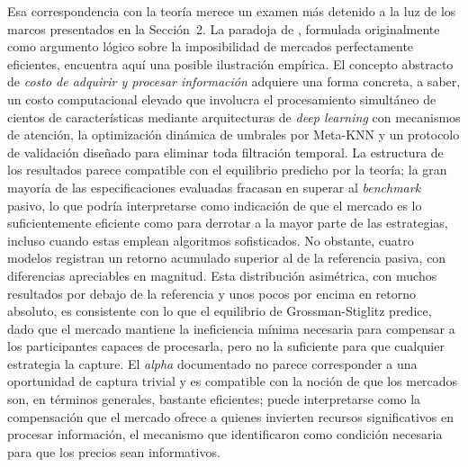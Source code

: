 ﻿\documentclass[11pt,a4paper]{article}
\begin{document}
Esa correspondencia con la teor\'ia merece un examen m\'as detenido a la luz de los marcos presentados en la Secci\'on~2. La paradoja de \citet{grossman1980}, formulada originalmente como argumento l\'ogico sobre la imposibilidad de mercados perfectamente eficientes, encuentra aqu\'i una posible ilustraci\'on emp\'irica. El concepto abstracto de \textit{costo de adquirir y procesar informaci\'on} adquiere una forma concreta, a saber, un costo computacional elevado que involucra el procesamiento simult\'aneo de cientos de caracter\'isticas mediante arquitecturas de \textit{deep learning} con mecanismos de atenci\'on, la optimizaci\'on din\'amica de umbrales por Meta-KNN y un protocolo de validaci\'on dise\~nado para eliminar toda filtraci\'on temporal. La estructura de los resultados parece compatible con el equilibrio predicho por la teor\'ia; la gran mayor\'ia de las especificaciones evaluadas fracasan en superar al \textit{benchmark} pasivo, lo que podr\'ia interpretarse como indicaci\'on de que el mercado es lo suficientemente eficiente como para derrotar a la mayor parte de las estrategias, incluso cuando estas emplean algoritmos sofisticados. No obstante, cuatro modelos registran un retorno acumulado superior al de la referencia pasiva, con diferencias apreciables en magnitud. Esta distribuci\'on asim\'etrica, con muchos resultados por debajo de la referencia y unos pocos por encima en retorno absoluto, es consistente con lo que el equilibrio de Grossman-Stiglitz predice, dado que el mercado mantiene la ineficiencia m\'inima necesaria para compensar a los participantes capaces de procesarla, pero no la suficiente para que cualquier estrategia la capture. El \textit{alpha} documentado no parece corresponder a una oportunidad de captura trivial y es compatible con la noci\'on de que los mercados son, en t\'erminos generales, bastante eficientes; puede interpretarse como la compensaci\'on que el mercado ofrece a quienes invierten recursos significativos en procesar informaci\'on, el mecanismo que \citet{grossman1980} identificaron como condici\'on necesaria para que los precios sean informativos.
\end{document}

